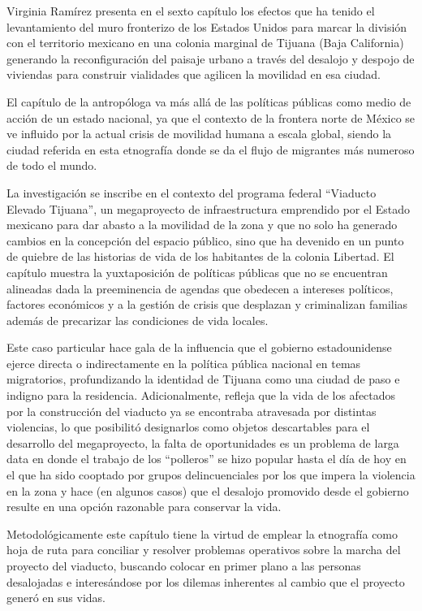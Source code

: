 \documentclass[
  spanish,
  11pt,
  a4paper,
]{scrbook}
\begin{document}
\vspace*{.75cm}

Virginia Ramírez presenta en el sexto capítulo los efectos que ha tenido
el levantamiento del muro fronterizo de los Estados Unidos para marcar
la división con el territorio mexicano en una colonia marginal de
Tijuana (Baja California) generando la reconfiguración del paisaje
urbano a través del desalojo y despojo de viviendas para construir
vialidades que agilicen la movilidad en esa ciudad.

El capítulo de la antropóloga va más allá de las políticas públicas como
medio de acción de un estado nacional, ya que el contexto de la frontera
norte de México se ve influido por la actual crisis de movilidad humana
a escala global, siendo la ciudad referida en esta etnografía donde se
da el flujo de migrantes más numeroso de todo el mundo.

La investigación se inscribe en el contexto del programa federal
``Viaducto Elevado Tijuana'', un megaproyecto de infraestructura
emprendido por el Estado mexicano para dar abasto a la movilidad de la
zona y que no solo ha generado cambios en la concepción del espacio
público, sino que ha devenido en un punto de quiebre de las historias de
vida de los habitantes de la colonia Libertad. El capítulo muestra la
yuxtaposición de políticas públicas que no se encuentran alineadas dada
la preeminencia de agendas que obedecen a intereses políticos, factores
económicos y a la gestión de crisis que desplazan y criminalizan
familias además de precarizar las condiciones de vida locales.

Este caso particular hace gala de la influencia que el gobierno
estadounidense ejerce directa o indirectamente en la política pública
nacional en temas migratorios, profundizando la identidad de Tijuana
como una ciudad de paso e indigno para la residencia. Adicionalmente,
refleja que la vida de los afectados por la construcción del viaducto ya
se encontraba atravesada por distintas violencias, lo que posibilitó
designarlos como objetos descartables para el desarrollo del
megaproyecto, la falta de oportunidades es un problema de larga data en
donde el trabajo de los ``polleros'' se hizo popular hasta el día de hoy
en el que ha sido cooptado por grupos delincuenciales por los que impera
la violencia en la zona y hace (en algunos casos) que el desalojo
promovido desde el gobierno resulte en una opción razonable para
conservar la vida.

Metodológicamente este capítulo tiene la virtud de emplear la etnografía
como hoja de ruta para conciliar y resolver problemas operativos sobre
la marcha del proyecto del viaducto, buscando colocar en primer plano a
las personas desalojadas e interesándose por los dilemas inherentes al
cambio que el proyecto generó en sus vidas.
\end{document}
